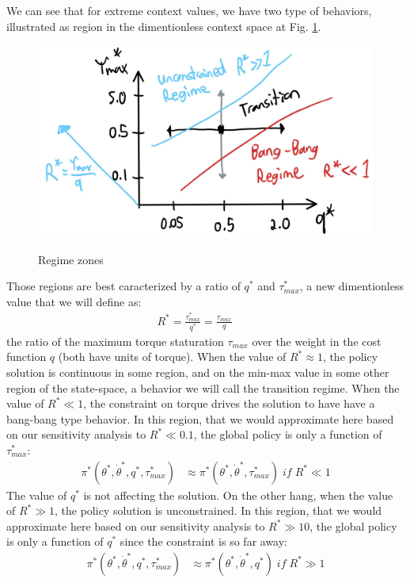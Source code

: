 We can see that for extreme context values, we have two type of behaviors, illustrated as region in the dimentionless context space at Fig. \ref{fig:regimeszones}. 
\begin{figure}[ht]
\begin{center}
\includegraphics[width=0.99\linewidth]{fig/regime_zones.jpg}
\caption{Regime zones}
\vspace{-10pt}
\label{fig:regimeszones}
\end{center}
\end{figure}
Those regions are best caracterized by a ratio of $q^*$ and $\tau_{max}^*$, a new dimentionless value that we will define as:
\begin{align}
R^* = \frac{\tau^*_{max}}{q^*} = \frac{\tau_{max}}{q} \quad\quad 
\end{align}
the ratio of the maximum torque staturation $\tau_{max}$ over the weight in the cost function $q$ (both have units of torque). When the value of $R^* \approx 1$, the policy solution is continuous in some region, and on the min-max value in some other region of the state-space, a behavior we will call the transition regime. When the value of $R^* \ll 1$, the constraint on torque drives the solution to have have a bang-bang type behavior. In this region, that we would approximate here based on our sensitivity analysis to $R^* \ll 0.1$, the global policy is only a function of $\tau_{max}^*$:
\begin{align}
\pi^*( \theta^* , \dot{\theta}^*, q^*, \tau_{max}^*) &\approx 
\pi^*( \theta^* , \dot{\theta}^* , \tau_{max}^* ) \; if \; R^* \ll 1
\label{eq:bangbang_policy}
\end{align}
The value of $q^*$ is not affecting the solution. On the other hang, when the value of $R^* \gg 1$, the policy solution is unconstrained. In this region, that we would approximate here based on our sensitivity analysis to $R^* \gg 10$, the global policy is only a function of $q^*$ since the constraint is so far away:
\begin{align}
\pi^*( \theta^* , \dot{\theta}^*, q^*, \tau_{max}^*) &\approx 
\pi^*( \theta^* , \dot{\theta}^* , q^* ) \; if \;  R^* \gg 1 
\label{eq:unconstrained_policy}
\end{align}

